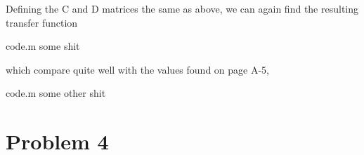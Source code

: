 \documentclass[12pt]{article}
\begin{document}
\noindent Defining the C and D matrices the same as above, we can again find the resulting transfer function

\begin{filecontents*}{code.m}
some shit
\end{filecontents*}


\noindent which compare quite well with the values found on page A-5,

\begin{filecontents*}{code.m}
some other shit
\end{filecontents*}


\newpage
\section{Problem 4}
\end{document}
